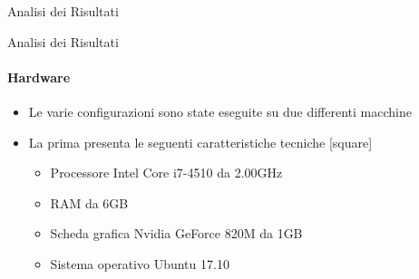 \documentclass[
 ]{beamer}
\begin{document}

\begin{frame}[c]
  \centering
  \bigskip \bigskip    
  \Huge Analisi dei Risultati
\end{frame}

\begin{frame}{Analisi dei Risultati}
    \framesubtitle{Hardware}
    \smallskip
    \begin{itemize} [<+->]
        \setlength\itemsep{2em}
        \item \large Le varie configurazioni sono state eseguite su due differenti macchine
        \item \large La prima presenta le seguenti caratteristiche tecniche       
        \bigskip
        [square] 
        \begin{itemize} [<+->] 
        \setlength\itemsep{2.5em}
            \item \large Processore Intel Core i7-4510 da 2.00GHz
            \item \large RAM da 6GB
            \item \large Scheda grafica Nvidia GeForce 820M da 1GB
            \item \large Sistema operativo Ubuntu 17.10                    
        \end{itemize}        
    \end{itemize}     
\end{frame}
\end{document}
